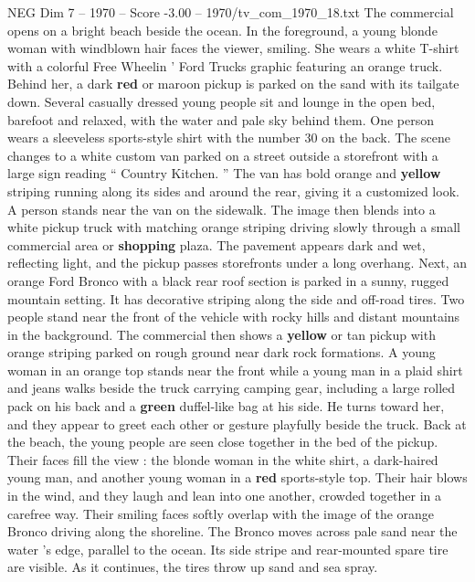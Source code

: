 \begin{textsample}{NEG Dim 7 – 1970 – Score -3.00 – 1970/tv\_com\_1970\_18.txt}  \label{ex:f7_neg_062}
The commercial opens on a bright beach beside the ocean.
In the foreground, a young blonde woman with windblown hair faces the viewer, smiling.
She wears a white T-shirt with a colorful Free Wheelin ’ Ford Trucks graphic featuring an orange truck.
Behind her, a dark \textbf{red} or maroon pickup is parked on the sand with its tailgate down.
Several casually dressed young people sit and lounge in the open bed, barefoot and relaxed, with the water and pale sky behind them.
One person wears a sleeveless sports-style shirt with the number 30 on the back.
The scene changes to a white custom van parked on a street outside a storefront with a large sign reading “ Country Kitchen. ” The van has bold orange and \textbf{yellow} striping running along its sides and around the rear, giving it a customized look.
A person stands near the van on the sidewalk.
The image then blends into a white pickup truck with matching orange striping driving slowly through a small commercial area or \textbf{shopping} plaza.
The pavement appears dark and wet, reflecting light, and the pickup passes storefronts under a long overhang.
Next, an orange Ford Bronco with a black rear roof section is parked in a sunny, rugged mountain setting.
It has decorative striping along the side and off-road tires.
Two people stand near the front of the vehicle with rocky hills and distant mountains in the background.
The commercial then shows a \textbf{yellow} or tan pickup with orange striping parked on rough ground near dark rock formations.
A young woman in an orange top stands near the front while a young man in a plaid shirt and jeans walks beside the truck carrying camping gear, including a large rolled pack on his back and a \textbf{green} duffel-like bag at his side.
He turns toward her, and they appear to greet each other or gesture playfully beside the truck.
Back at the beach, the young people are seen close together in the bed of the pickup.
Their faces fill the view : the blonde woman in the white shirt, a dark-haired young man, and another young woman in a \textbf{red} sports-style top.
Their hair blows in the wind, and they laugh and lean into one another, crowded together in a carefree way.
Their smiling faces softly overlap with the image of the orange Bronco driving along the shoreline.
The Bronco moves across pale sand near the water ’s edge, parallel to the ocean.
Its side stripe and rear-mounted spare tire are visible.
As it continues, the tires throw up sand and sea spray.

\end{textsample}
